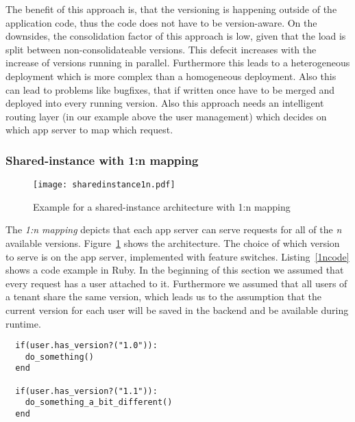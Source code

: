 The benefit of this approach is, that the versioning is happening outside of the application code, thus the code does not have to be version-aware. On the downsides, the consolidation factor of this approach is low, given that the load is split between non-consolidateable versions. This defecit increases with the increase of versions running in parallel. Furthermore this leads to a heterogeneous deployment which is more complex than a homogeneous deployment.  Also this can lead to problems like bugfixes, that if written once have to be merged and deployed into every running version. Also this approach needs an intelligent routing layer (in our example above the user management) which decides on which app server to map which request.

%
%

\subsubsection{Shared-instance with 1:n mapping}

\begin{figure}
\centering
\texttt{[image: sharedinstance1n.pdf]}
\caption{Example for a shared-instance architecture with 1:n mapping}
\label{fig:sharedinstance1n}
\end{figure}

The \emph{1:n mapping} depicts that each app server can serve requests for all of the \emph{n} available versions. Figure~\ref{fig:sharedinstance1n} shows the architecture. The choice of which version to serve is on the app server, implemented with feature switches. Listing~\ref{1ncode} shows a code example in Ruby. In the beginning of this section we assumed that every request has a user attached to it. Furthermore we assumed that all users of a tenant share the same version, which leads us to the assumption that the current version for each user will be saved in the backend and be available during runtime.

\begin{lstlisting}
  if(user.has_version?("1.0")):
    do_something()
  end

  if(user.has_version?("1.1")):
    do_something_a_bit_different()
  end
\end{lstlisting}

